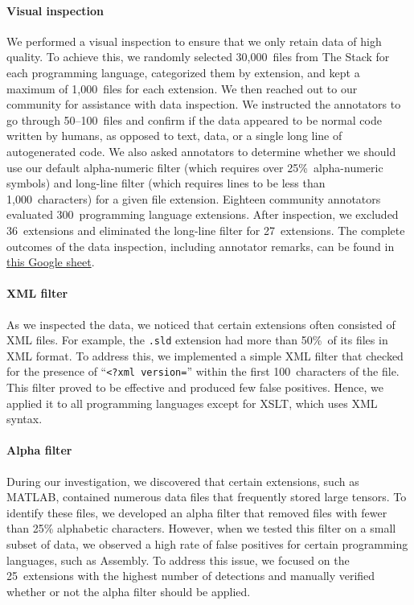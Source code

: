 \documentclass[10pt]{article} %
\begin{document}
\paragraph{Visual inspection} We performed a visual inspection to ensure that we only retain data of high quality. To achieve this, we randomly selected 30,000~files from The Stack for each programming language, categorized them by extension, and kept a maximum of 1,000~files for each extension. We then reached out to our community for assistance with data inspection. We instructed the annotators to go through 50--100~files and confirm if the data appeared to be normal code written by humans, as opposed to text, data, or a single long line of autogenerated code. We also asked annotators to determine whether we should use our default alpha-numeric filter (which requires over 25\%~alpha-numeric symbols) and long-line filter (which requires lines to be less than 1,000~characters) for a given file extension. Eighteen community annotators evaluated 300~programming language extensions. After inspection, we excluded 36~extensions and eliminated the long-line filter for 27~extensions. The complete outcomes of the data inspection, including annotator remarks, can be found in  \href{https://docs.google.com/spreadsheets/d/1Lk-pTk_rXI__fCgixr7ZWSi8wR09Zzd2j_G90J80r00/edit?usp=sharing}{this Google sheet}. 

\paragraph{XML filter} As we inspected the data, we noticed that certain extensions often consisted of XML files. For example, the \texttt{.sld} extension had more than 50\%~of its files in XML format. To address this, we implemented a simple XML filter that checked for the presence of ``\texttt{<?xml version=}'' within the first 100~characters of the file. This filter proved to be effective and produced few false positives. Hence, we applied it to all programming languages except for XSLT, which uses XML syntax.

\paragraph{Alpha filter} During our investigation, we discovered that certain extensions, such as MATLAB, contained numerous data files that frequently stored large tensors. To identify these files, we developed an alpha filter that removed files with fewer than 25\% alphabetic characters. However, when we tested this filter on a small subset of data, we observed a high rate of false positives for certain programming languages, such as Assembly. To address this issue, we focused on the 25~extensions with the highest number of detections and manually verified whether or not the alpha filter should be applied.
\end{document}
